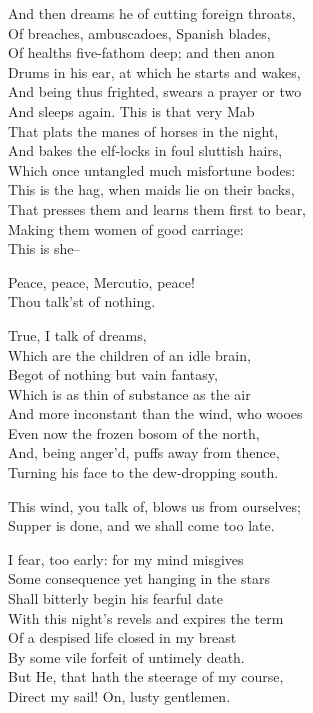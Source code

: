 \begin{speech}
And then dreams he of cutting foreign throats, \\
Of breaches, ambuscadoes, Spanish blades, \\
Of healths five-fathom deep; and then anon \\
Drums in his ear, at which he starts and wakes, \\
And being thus frighted, swears a prayer or two \\
And sleeps again. This is that very Mab \\
That plats the manes of horses in the night, \\
And bakes the elf-locks in foul sluttish hairs, \\
Which once untangled much misfortune bodes: \\
This is the hag, when maids lie on their backs, \\
That presses them and learns them first to bear, \\
Making them women of good carriage: \\
This is she-- \\
\end{speech}
\begin{speech}
Peace, peace, Mercutio, peace! \\
Thou talk'st of nothing. \\
\end{speech}
\begin{speech}
True, I talk of dreams, \\
Which are the children of an idle brain, \\
Begot of nothing but vain fantasy, \\
Which is as thin of substance as the air \\
And more inconstant than the wind, who wooes \\
Even now the frozen bosom of the north, \\
And, being anger'd, puffs away from thence, \\
Turning his face to the dew-dropping south. \\
\end{speech}
\begin{speech}
This wind, you talk of, blows us from ourselves; \\

Supper is done, and we shall come too late. \\
\end{speech}
\begin{speech}
I fear, too early: for my mind misgives \\
Some consequence yet hanging in the stars \\
Shall bitterly begin his fearful date \\
With this night's revels and expires the term \\
Of a despised life closed in my breast \\
By some vile forfeit of untimely death. \\
But He, that hath the steerage of my course, \\
Direct my sail!   On, lusty gentlemen. \\
\end{speech}
